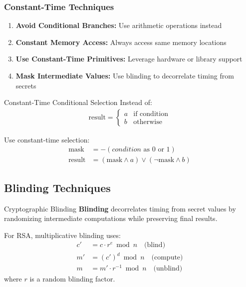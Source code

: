 \documentclass[12pt,a4paper]{article}
\theoremstyle{definition}
\begin{document}
\subsubsection{Constant-Time Techniques}

\begin{enumerate}
    \item \textbf{Avoid Conditional Branches:} Use arithmetic operations instead
    \item \textbf{Constant Memory Access:} Always access same memory locations
    \item \textbf{Use Constant-Time Primitives:} Leverage hardware or library support
    \item \textbf{Mask Intermediate Values:} Use blinding to decorrelate timing from secrets
\end{enumerate}

\begin{examplebox}{Constant-Time Conditional Selection}
Instead of:
\begin{align}
\text{result} = \begin{cases}
a & \text{if condition} \\
b & \text{otherwise}
\end{cases}
\end{align}

Use constant-time selection:
\begin{align}
\text{mask} &= -(condition \text{ as 0 or 1}) \\
\text{result} &= (\text{mask} \land a) \lor (\neg\text{mask} \land b)
\end{align}
\end{examplebox}

\subsection{Blinding Techniques}

\begin{definitionbox}{Cryptographic Blinding}
\textbf{Blinding} decorrelates timing from secret values by randomizing intermediate computations while preserving final results.

For RSA, multiplicative blinding uses:
\begin{align}
c' &= c \cdot r^e \bmod n \quad \text{(blind)} \\
m' &= (c')^d \bmod n \quad \text{(compute)} \\
m &= m' \cdot r^{-1} \bmod n \quad \text{(unblind)}
\end{align}
where $r$ is a random blinding factor.
\end{definitionbox}
\end{document}
